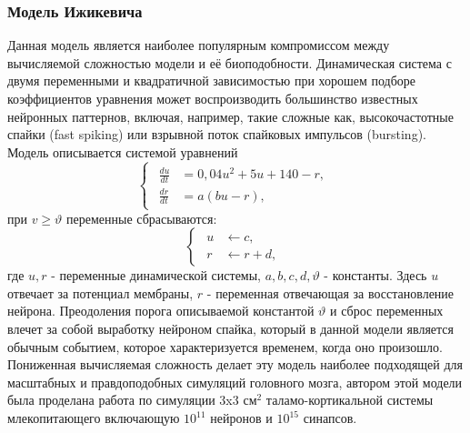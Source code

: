 \documentclass[a4paper,10pt]{article}
\begin{document}
\subsubsection{Модель Ижикевича}
\indent Данная модель является наиболее популярным компромиссом между вычисляемой сложностью модели и её биоподобности. Динамическая система с двумя переменными и квадратичной зависимостью при хорошем подборе коэффициентов уравнения может воспроизводить большинство известных нейронных паттернов\cite{IzhSimpleModel}, включая, например, такие сложные как, высокочастотные спайки (fast spiking) или взрывной поток спайковых импульсов (bursting).\\
\indent Модель описывается системой уравнений
\begin{equation}\label{eq:izh}
\left\{  \begin{array}{c} \begin{aligned}
	\frac{du}{dt} &= 0,04u^2+5u+140-r, \nonumber \\
	\frac{dr}{dt} &= a(bu-r), \nonumber 
	\end{aligned}	
	\end{array} \right.
\end{equation}
при $v \geq \vartheta$ переменные сбрасываются:
\begin{equation}\label{eq:izh_reset}
\left\{  \begin{array}{c} \begin{aligned}
	u &\leftarrow c \nonumber, \\
	r &\leftarrow r+d,
	\end{aligned}	
	\end{array} \right.
\end{equation}
где $u, r$ - переменные динамической системы, $a, b, c, d, \vartheta$ - константы. Здесь $u$ отвечает за потенциал мембраны, $r$ - переменная отвечающая за восстановление нейрона. Преодоления порога описываемой константой $\vartheta$ и сброс переменных влечет за собой выработку нейроном спайка, который в данной модели является обычным событием, которое характеризуется временем, когда оно произошло.\\
\indent Пониженная вычисляемая сложность делает эту модель наиболее подходящей для масштабных и правдоподобных симуляций головного мозга, автором этой модели была проделана работа \cite{IzhTalam} по симуляции 3x3 см$^2$ таламо-кортикальной системы млекопитающего включающую $10^{11}$ нейронов и $10^{15}$ синапсов.
\end{document}
